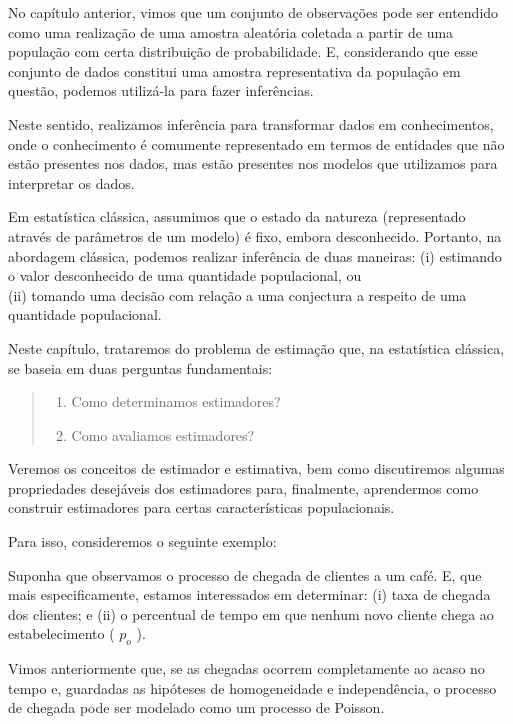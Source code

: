 \documentclass[
]{book}
\providecommand{\tightlist}{%
  \setlength{\itemsep}{0pt}\setlength{\parskip}{0pt}}
\theoremstyle{definition}
\theoremstyle{definition}
\theoremstyle{definition}
\theoremstyle{remark}
\begin{document}
No capítulo anterior, vimos que um conjunto de observações pode ser entendido como uma realização de uma amostra aleatória coletada a partir de uma população com certa distribuição de probabilidade. E, considerando que esse conjunto de dados constitui uma amostra representativa da população em questão, podemos utilizá-la para fazer inferências.

Neste sentido, realizamos inferência para transformar dados em conhecimentos, onde o conhecimento é comumente representado em termos de entidades que não estão presentes nos dados, mas estão presentes nos modelos que utilizamos para interpretar os dados.

Em estatística clássica, assumimos que o estado da natureza (representado através de parâmetros de um modelo) é fixo, embora desconhecido. Portanto, na abordagem clássica, podemos realizar inferência de duas maneiras:
(i) estimando o valor desconhecido de uma quantidade populacional, ou\\
(ii) tomando uma decisão com relação a uma conjectura a respeito de uma quantidade populacional.

Neste capítulo, trataremos do problema de estimação que, na estatística clássica, se baseia em duas perguntas fundamentais:

\begin{quote}
\begin{enumerate}
\def\labelenumi{\arabic{enumi}.}
\tightlist
\item
  Como determinamos estimadores?\\
\item
  Como avaliamos estimadores?
\end{enumerate}
\end{quote}

Veremos os conceitos de estimador e estimativa, bem como discutiremos algumas propriedades desejáveis dos estimadores para, finalmente, aprendermos como construir estimadores para certas características populacionais.

Para isso, consideremos o seguinte exemplo:

Suponha que observamos o processo de chegada de clientes a um café. E, que mais especificamente, estamos interessados em determinar: (i) taxa de chegada dos clientes; e (ii) o percentual de tempo em que nenhum novo cliente chega ao estabelecimento ( \(p_o\) ).

Vimos anteriormente que, se as chegadas ocorrem completamente ao acaso no tempo e,
guardadas as hipóteses de homogeneidade e independência, o processo de chegada pode ser modelado como um processo de Poisson.
\end{document}
